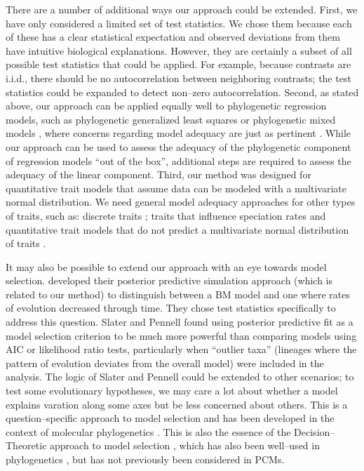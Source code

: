 \documentclass[a4paper,11pt]{article}
\begin{document}
There are a number of additional ways our approach could be extended. First, we have only considered a limited set of test statistics. We chose them because each of these has a clear statistical expectation and observed deviations from them have intuitive biological explanations. However, they are certainly a subset of all possible test statistics that could be applied. 
For example, because contrasts are i.i.d., there should be no autocorrelation between neighboring contrasts; the test statistics could be expanded to detect non--zero autocorrelation. Second, as stated above, our approach can be applied equally well to phylogenetic regression models, such as phylogenetic generalized least squares \citep{Grafen1989, MartinsHansen1997} or phylogenetic mixed models \citep{Lynch1991, Housworth2004, Hadfield2010}, where concerns regarding model adequacy are just as pertinent \citep{Hansen2012}. While our approach can be used to assess the adequacy of the phylogenetic component of regression models ``out of the box'', additional steps are required to assess the adequacy of the linear component.  Third, our method was designed for quantitative trait models that assume data can be modeled with a multivariate normal distribution. We need general model adequacy approaches for other types of traits, such as: discrete traits \citep[i.e., binary, multistate, ordinal; see][for recent discussions of this]{Beaulieu2013, Blackmon2014, MaddisonFitzJohn}; traits that influence speciation rates \citep[e.g.,][]{Maddison2007, FitzJohn2010} and quantitative trait models that do not predict a multivariate normal distribution of traits \citep{Landis2012, Landispreprint}.

It may also be possible to extend our approach with an eye towards model selection. \citet{SlaterPennell} developed their posterior predictive simulation approach (which is related to our method) to distinguish between a BM model and one where rates of evolution decreased through time. They chose test statistics specifically to address this question. Slater and Pennell found using posterior predictive fit as a model selection criterion to be much more powerful than comparing models using AIC or likelihood ratio tests, particularly when ``outlier taxa'' (lineages where the pattern of evolution deviates from the overall model) were included in the analysis. The logic of Slater and Pennell could be extended to other scenarios; to test some evolutionary hypotheses, we may care a lot about whether a model explains varation along some axes but be less concerned about others. This is a question--specific approach to model selection and has been developed in the context of molecular phylogenetics \citep{Bollback2002, Lewis2013}. This is also the essence of the Decision--Theoretic approach to model selection \citep{Robert2007}, which has also been well--used in phylogenetics \citep{Minin2003}, but has not previously been considered in PCMs.
\end{document}
